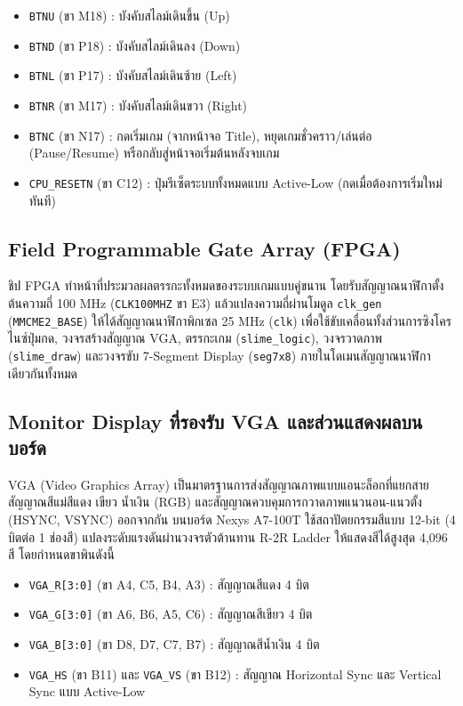 \documentclass[12pt,a4paper]{article}
\begin{document}
\begin{itemize}[leftmargin=1.5cm]
    \item \texttt{BTNU} (ขา M18) : บังคับสไลม์เดินขึ้น (Up)
    \item \texttt{BTND} (ขา P18) : บังคับสไลม์เดินลง (Down)
    \item \texttt{BTNL} (ขา P17) : บังคับสไลม์เดินซ้าย (Left)
    \item \texttt{BTNR} (ขา M17) : บังคับสไลม์เดินขวา (Right)
    \item \texttt{BTNC} (ขา N17) : กดเริ่มเกม (จากหน้าจอ Title), หยุดเกมชั่วคราว/เล่นต่อ (Pause/Resume) หรือกลับสู่หน้าจอเริ่มต้นหลังจบเกม
    \item \texttt{CPU\_RESETN} (ขา C12) : ปุ่มรีเซ็ตระบบทั้งหมดแบบ Active-Low (กดเมื่อต้องการเริ่มใหม่ทันที)
\end{itemize}

\subsection{Field Programmable Gate Array (FPGA)}

ชิป FPGA ทำหน้าที่ประมวลผลตรรกะทั้งหมดของระบบเกมแบบคู่ขนาน โดยรับสัญญาณนาฬิกาตั้งต้นความถี่ 100 MHz (\texttt{CLK100MHZ} ขา E3) แล้วแปลงความถี่ผ่านโมดูล \texttt{clk\_gen} (\texttt{MMCME2\_BASE}) ให้ได้สัญญาณนาฬิกาพิกเซล 25 MHz (\texttt{clk}) เพื่อใช้ขับเคลื่อนทั้งส่วนการซิงโครไนซ์ปุ่มกด, วงจรสร้างสัญญาณ VGA, ตรรกะเกม (\texttt{slime\_logic}), วงจรวาดภาพ (\texttt{slime\_draw}) และวงจรขับ 7-Segment Display (\texttt{seg7x8}) ภายในโดเมนสัญญาณนาฬิกาเดียวกันทั้งหมด

\subsection{Monitor Display ที่รองรับ VGA และส่วนแสดงผลบนบอร์ด}

VGA (Video Graphics Array) เป็นมาตรฐานการส่งสัญญาณภาพแบบแอนะล็อกที่แยกสายสัญญาณสีแม่สีแดง เขียว น้ำเงิน (RGB) และสัญญาณควบคุมการกวาดภาพแนวนอน-แนวตั้ง (HSYNC, VSYNC) ออกจากกัน บนบอร์ด Nexys A7-100T ใช้สถาปัตยกรรมสีแบบ 12-bit (4 บิตต่อ 1 ช่องสี) แปลงระดับแรงดันผ่านวงจรตัวต้านทาน R-2R Ladder ให้แสดงสีได้สูงสุด 4,096 สี โดยกำหนดขาพินดังนี้

\begin{itemize}[leftmargin=1.5cm]
    \item \texttt{VGA\_R[3:0]} (ขา A4, C5, B4, A3) : สัญญาณสีแดง 4 บิต
    \item \texttt{VGA\_G[3:0]} (ขา A6, B6, A5, C6) : สัญญาณสีเขียว 4 บิต
    \item \texttt{VGA\_B[3:0]} (ขา D8, D7, C7, B7) : สัญญาณสีน้ำเงิน 4 บิต
    \item \texttt{VGA\_HS} (ขา B11) และ \texttt{VGA\_VS} (ขา B12) : สัญญาณ Horizontal Sync และ Vertical Sync แบบ Active-Low
\end{itemize}
\end{document}
